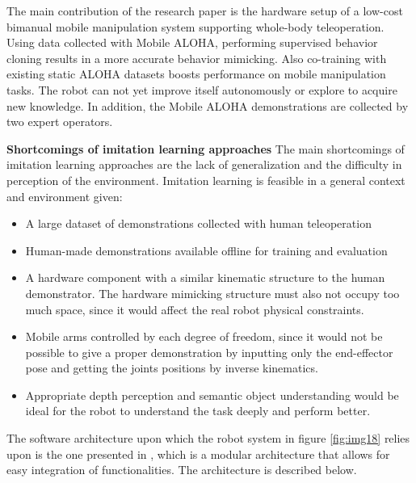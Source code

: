 The main contribution of the research paper \cite{tony2024mobile} is the hardware setup of
a low-cost bimanual mobile manipulation system supporting whole-body teleoperation.
Using data collected with Mobile ALOHA, performing supervised behavior cloning results in a more 
accurate behavior mimicking. Also co-training with existing static ALOHA datasets \cite{tony2023bimanual}
boosts performance on mobile manipulation tasks. 
The robot can not yet improve itself autonomously or explore to acquire new knowledge.
In addition, the Mobile ALOHA demonstrations are collected by two expert operators.

\textbf{Shortcomings of imitation learning approaches} \quad
The main shortcomings of imitation learning approaches are the lack of generalization and
the difficulty in perception of the environment. Imitation learning is feasible in a general 
context and environment given:

\begin{itemize}
	\item A large dataset of demonstrations collected with human teleoperation
	\item Human-made demonstrations available offline for training and evaluation
	\item A hardware component with a similar kinematic structure to the human demonstrator.
		The hardware mimicking structure must also not occupy too much space, since it would
		affect the real robot physical constraints.
	\item Mobile arms controlled by each degree of freedom, since it would not be possible
		to give a proper demonstration by inputting only the end-effector pose and getting
		the joints positions by inverse kinematics.
	\item Appropriate depth perception and semantic object understanding would be ideal
		for the robot to understand the task deeply and perform better.
\end{itemize}

The software architecture upon which the robot system in figure \ref{fig:img18} relies upon
is the one presented in \cite{tony2023bimanual}, which is a modular architecture
that allows for easy integration of functionalities. The architecture is described below.


